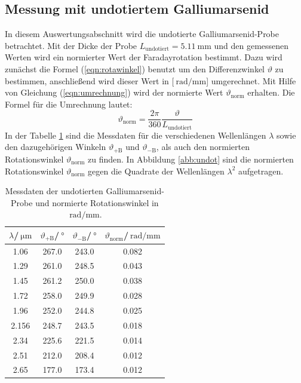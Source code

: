 \subsection{Messung mit undotiertem Galliumarsenid}
\label{sec:undotiert}
In diesem Auswertungsabschnitt wird die undotierte Galliumarsenid-Probe betrachtet.
Mit der Dicke der Probe $L_\mathrm{undotiert}=\SI{5.11}{\milli\meter}$ und den gemessenen Werten wird ein normierter Wert der Faradayrotation bestimmt. Dazu wird zunächst die Formel (\ref{eqn:rotawinkel}) benutzt um den Differenzwinkel $\vartheta$ zu bestimmen, anschließend
wird dieser Wert in [$\SI{}{\radian\per\milli\meter}$] umgerechnet. Mit Hilfe von Gleichung (\ref{eqn:umrechnung}) wird der normierte Wert $\vartheta_\mathrm{norm}$ erhalten. Die Formel für die Umrechnung lautet:
\begin{equation}
  \label{eqn:umrechnung}
  \vartheta_\mathrm{norm}=\dfrac{2\pi}{360}\dfrac{\vartheta}{L_\mathrm{undotiert}}
\end{equation}
In der Tabelle \ref{tab:undot} sind die Messdaten für die verschiedenen Wellenlängen $\lambda$ sowie den dazugehörigen Winkeln $\vartheta_\mathrm{+B}$ und $\vartheta_\mathrm{-B}$, als auch den normierten Rotationswinkel $\vartheta_\mathrm{norm}$ zu finden.
In Abbildung \ref{abb:undot} sind die normierten Rotationswinkel $\vartheta_\mathrm{norm}$ gegen die Quadrate der Wellenlängen $\lambda^2$ aufgetragen.
\begin{table}
  \centering
  \caption{Messdaten der undotierten Galliumarsenid-Probe und normierte Rotationswinkel in $\SI{}{\radian\per\milli\meter}$.}
  \label{tab:undot}
  \begin{tabular}{c | c | c | c}
    \toprule
    $\lambda$/$\SI{}{\micro\meter}$ & $\vartheta_\mathrm{+B}$/$\SI{}{\degree}$ & $\vartheta_\mathrm{-B}$/$\SI{}{\degree}$& $\vartheta_{\mathrm{norm}}$/$\SI{}{\radian\per\milli\meter}$ \\
    \midrule
    1.06 & 267.0 & 243.0 & 0.082 \\
    1.29 & 261.0 & 248.5 & 0.043 \\
    1.45 & 261.2 & 250.0 & 0.038 \\
    1.72 & 258.0 & 249.9 & 0.028 \\
    1.96 & 252.0 & 244.8 & 0.025 \\
    2.156 & 248.7 & 243.5 & 0.018 \\
    2.34 & 225.6 & 221.5 & 0.014 \\
    2.51 & 212.0 & 208.4 & 0.012 \\
    2.65 & 177.0 & 173.4 & 0.012 \\
    \bottomrule
  \end{tabular}
\end{table}
\FloatBarrier

